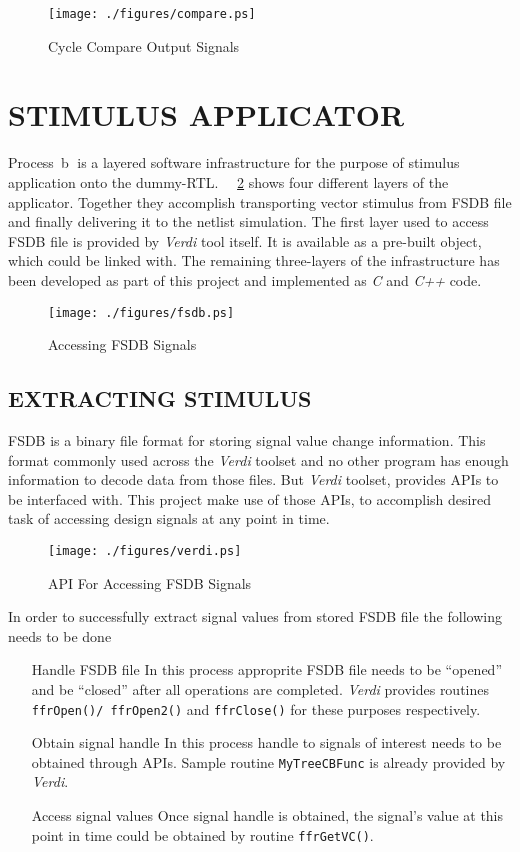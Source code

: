 \begin{figure}[h]
\centering
\texttt{[image: ./figures/compare.ps]}
\caption{Cycle Compare Output Signals}
\label{fig:compare.ps}
\end{figure}


\section{STIMULUS APPLICATOR}
\label{sec:dualsim:sa}
Process~\textcircled{b} is a layered software infrastructure for the purpose of stimulus application onto the dummy-RTL. ~\figurename{~\ref{fig:fsdb.ps}} shows four different layers of the applicator. Together they accomplish transporting vector stimulus from FSDB file and finally delivering it to the netlist simulation. The first layer used to access FSDB file is provided by {\it Verdi} tool itself. It is available as a pre-built object\cite{Verdi:FsdbReader}, which could be linked with. The remaining three-layers of the infrastructure has been developed as part of this project and implemented as {\it C} and {\it C++} code.

\begin{figure}[h]
\centering
\texttt{[image: ./figures/fsdb.ps]}
\caption{Accessing FSDB Signals}
\label{fig:fsdb.ps}
\end{figure}

\subsection{EXTRACTING STIMULUS}
FSDB is a binary file format for storing signal value change information. This format commonly used across the {\it Verdi} toolset and no other program has enough information to decode data from those files. But {\it Verdi} toolset, provides APIs\cite{Verdi:FsdbReader}  to be interfaced with. This project make use of those APIs, to accomplish desired task of accessing design signals at any point in time.

\begin{figure}[h]
\centering
\texttt{[image: ./figures/verdi.ps]}
\caption{API For Accessing FSDB Signals}
\label{fig:verdi.eps}
\end{figure}

In order to successfully extract signal values from stored FSDB file the following needs to be done
\begin{enumerate}
\item[Handle FSDB file] In this process approprite FSDB file needs to be ``opened'' and be ``closed'' after all operations are completed. {\it Verdi} provides routines \texttt{ffrOpen()/ ffrOpen2()} and \texttt{ffrClose()} for these purposes respectively.
\item[Obtain signal handle] In this process handle to signals of interest needs to be obtained through APIs. Sample routine \texttt{MyTreeCBFunc}\cite[p.~3]{Verdi:FsdbReader} is already provided by {\it Verdi}.
\item[Access signal values] Once signal handle is obtained, the signal's value at this point in time could be obtained by routine \texttt{ffrGetVC()}.
\end{enumerate}

